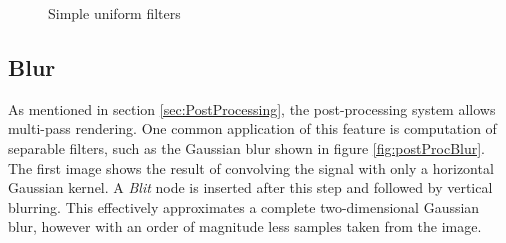\begin{figure}[h!]
  \centering
  \caption{Simple uniform filters}
  \label{fig:postProcSimple}
\end{figure}

\subsection{Blur}

As mentioned in section \ref{sec:PostProcessing}, the post-processing system allows multi-pass rendering. One common application of this feature is computation of separable filters, such as the Gaussian blur shown in figure \ref{fig:postProcBlur}. The first image shows the result of convolving the signal with only a horizontal Gaussian kernel. A \emph{Blit} node is inserted after this step and followed by vertical blurring. This effectively approximates a complete two-dimensional Gaussian blur, however with an order of magnitude less samples taken from the image.

